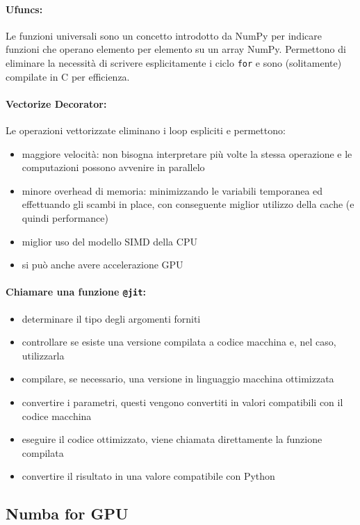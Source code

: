 \paragraph{Ufuncs:} Le funzioni universali sono un concetto introdotto da NumPy per indicare funzioni che operano elemento per elemento su un array NumPy. Permettono di eliminare la necessità di scrivere esplicitamente i ciclo \texttt{for} e sono (solitamente) compilate in C per efficienza. \\

\paragraph{Vectorize Decorator:} Le operazioni vettorizzate eliminano i loop espliciti e permettono: 
\begin{itemize}
	\item maggiore velocità: non bisogna interpretare più volte la stessa operazione e le computazioni possono avvenire in parallelo
	\item minore overhead di memoria: minimizzando le variabili temporanea ed effettuando gli scambi in place, con conseguente miglior utilizzo della cache (e quindi performance)
	\item miglior uso del modello SIMD della CPU
	\item si può anche avere accelerazione GPU
\end{itemize}

\paragraph{Chiamare una funzione \texttt{@jit}:} 
\begin{itemize}
	\item determinare il tipo degli argomenti forniti
	\item controllare se esiste una versione compilata a codice macchina e, nel caso, utilizzarla
	\item compilare, se necessario, una versione in linguaggio macchina ottimizzata
	\item convertire i parametri, questi vengono convertiti in valori compatibili con il codice macchina
	\item eseguire il codice ottimizzato, viene chiamata direttamente la funzione compilata
	\item convertire il risultato in una valore compatibile con Python
\end{itemize}

\subsection{Numba for GPU}

